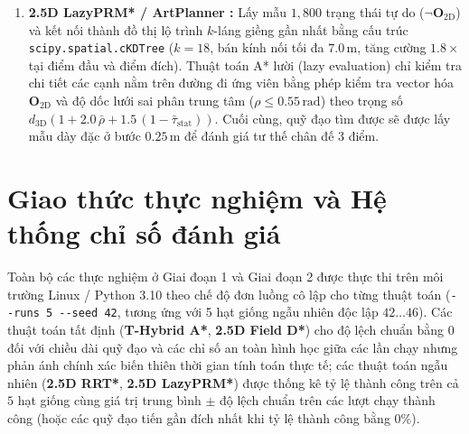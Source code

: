 \documentclass[a4paper,fleqn]{cas-sc}
\begin{document}
\begin{enumerate}
    \item \textbf{2.5D LazyPRM* / ArtPlanner \citep{lorenzwellhausen2023}:} Lấy mẫu $1{,}800$ trạng thái tự do ($\neg\mathbf{O}_{2\text{D}}$) và kết nối thành đồ thị lộ trình $k$-láng giềng gần nhất bằng cấu trúc \texttt{scipy.spatial.cKDTree} ($k = 18$, bán kính nối tối đa $7.0\,\text{m}$, tăng cường $1.8\times$ tại điểm đầu và điểm đích). Thuật toán A* lười (lazy evaluation) chỉ kiểm tra chi tiết các cạnh nằm trên đường đi ứng viên bằng phép kiểm tra vector hóa $\mathbf{O}_{2\text{D}}$ và độ dốc lưới sai phân trung tâm ($\rho \le 0.55\,\text{rad}$) theo trọng số $d_{3\text{D}}(1 + 2.0\,\bar{\rho} + 1.5\,(1 - \bar{\tau}_{\text{stat}}))$. Cuối cùng, quỹ đạo tìm được sẽ được lấy mẫu dày đặc ở bước $0.25\,\text{m}$ để đánh giá tư thế chân đế 3 điểm.
\end{enumerate}

\section{Giao thức thực nghiệm và Hệ thống chỉ số đánh giá}
\label{sec:protocol}

Toàn bộ các thực nghiệm ở Giai đoạn 1 và Giai đoạn 2 được thực thi trên môi trường Linux / Python 3.10 theo chế độ đơn luồng cô lập cho từng thuật toán (\texttt{-{}-runs 5 -{}-seed 42}, tương ứng với 5 hạt giống ngẫu nhiên độc lập $42\dots 46$). Các thuật toán tất định (\textbf{T-Hybrid A*}, \textbf{2.5D Field D*}) cho độ lệch chuẩn bằng $0$ đối với chiều dài quỹ đạo và các chỉ số an toàn hình học giữa các lần chạy nhưng phản ánh chính xác biến thiên thời gian tính toán thực tế; các thuật toán ngẫu nhiên (\textbf{2.5D RRT*}, \textbf{2.5D LazyPRM*}) được thống kê tỷ lệ thành công trên cả $5$ hạt giống cùng giá trị trung bình $\pm$ độ lệch chuẩn trên các lượt chạy thành công (hoặc các quỹ đạo tiến gần đích nhất khi tỷ lệ thành công bằng $0\%$).
\end{document}
